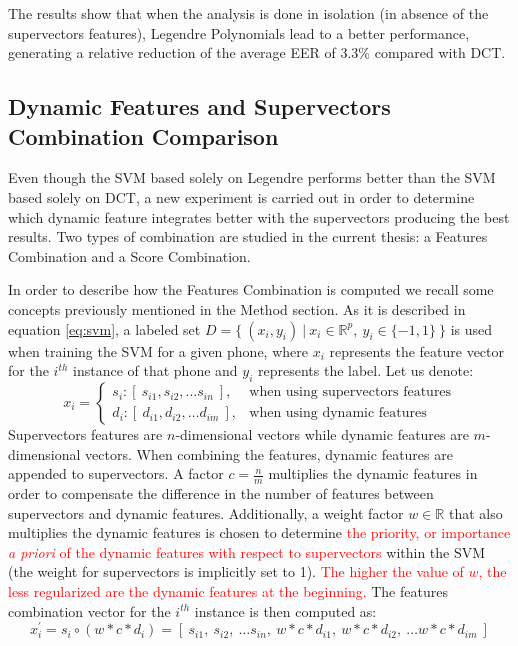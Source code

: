 The results show that when the analysis is done in isolation (in absence of the supervectors
features), Legendre Polynomials lead to a better performance, generating a relative reduction
of the average EER of 3.3\% compared with DCT.

\subsection{Dynamic Features and Supervectors Combination Comparison}

Even though the SVM based solely on Legendre performs better than the SVM based solely on
DCT, a new experiment is carried out in order to determine which
dynamic feature integrates better
with the supervectors producing the best results. Two types of combination are
studied in the current thesis: a Features Combination and a Score
Combination.

In order to describe how the Features Combination is computed we recall some
concepts previously mentioned in the Method section.
As it is described in equation \ref{eq:svm}, a labeled set
\mbox{$D=\{ \ (x_{i}, y_{i}) \ | \ x_{i} \in \mathbb{R}^{p}, \ y_{i} \in \{-1, 1\} \ \}$}
is used
when training the SVM for a given phone, where $x_{i}$ represents the feature vector for the
$i^{th}$ instance of that phone and $y_{i}$ represents the label.
Let us denote:
\begin{equation}
	x_{i} =
	\begin{cases}
		s_{i} : [ \ s_{i1}, s_{i2}, \dotsc s_{in} \ ], & \text{when using supervectors features} \\
		d_{i} : [ \ d_{i1}, d_{i2}, \dotsc d_{im} \ ], & \text{when using dynamic features}
	\end{cases}
\end{equation}
Supervectors features are $n$-dimensional vectors while dynamic features are $m$-dimensional
vectors. When combining the features, dynamic features are appended to supervectors.
A factor $c = \frac{n}{m}$ multiplies the dynamic features
in order to compensate the difference in
the number of features between supervectors and dynamic features.
Additionally, a weight factor $w \in \mathbb{R}$ that also multiplies the dynamic features
is chosen to determine
\textcolor{red}{
the priority, or importance \textit{a priori} of the dynamic features with respect to supervectors}
within the SVM (the weight for supervectors is implicitly set to 1).
\textcolor{red}{The higher the value of $w$, the less regularized are the dynamic features
at the beginning.}
The features combination vector for the $i^{th}$ instance is then computed as:
\begin{equation}
	x_{i}^{\prime} = s_{i} \circ (w * c * d_{i}) = [ \ s_{i1}, \ s_{i2}, \ \dotsc s_{in}, \ w * c * d_{i1}, \ w * c * d_{i2}, \ \dotsc w * c * d_{im} \ ]
	\label{eq:featuresCombination}
\end{equation}

